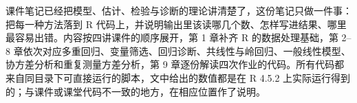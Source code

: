 \begin{notesabstract}
课件笔记已经把模型、估计、检验与诊断的理论讲清楚了，这份笔记只做一件事：把每一种方法落到 R 代码上，并说明输出里该读哪几个数、怎样写进结果、哪里最容易出错。内容按四讲课件的顺序展开，第 1 章补齐 R 的数据处理基础，第 2–8 章依次对应多重回归、变量筛选、回归诊断、共线性与岭回归、一般线性模型、协方差分析和重复测量方差分析，第 9 章逐份解读四次作业的代码。所有代码都来自同目录下可直接运行的脚本，文中给出的数值都是在 R 4.5.2 上实际运行得到的；与课件或课堂代码不一致的地方，在相应位置作了说明。
\end{notesabstract}
